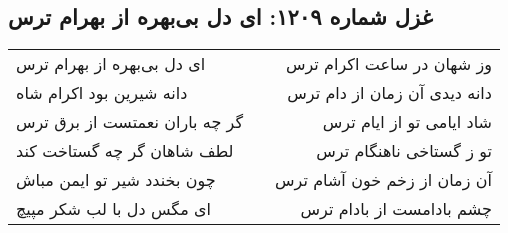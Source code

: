 \begin{center}
\section*{غزل شماره ۱۲۰۹: ای دل بی‌بهره از بهرام ترس}
\label{sec:1209}
\begin{longtable}{l p{0.5cm} r}
ای دل بی‌بهره از بهرام ترس
&&
وز شهان در ساعت اکرام ترس
\\
دانه شیرین بود اکرام شاه
&&
دانه دیدی آن زمان از دام ترس
\\
گر چه باران نعمتست از برق ترس
&&
شاد ایامی تو از ایام ترس
\\
لطف شاهان گر چه گستاخت کند
&&
تو ز گستاخی ناهنگام ترس
\\
چون بخندد شیر تو ایمن مباش
&&
آن زمان از زخم خون آشام ترس
\\
ای مگس دل با لب شکر مپیچ
&&
چشم بادامست از بادام ترس
\\
\end{longtable}
\end{center}
